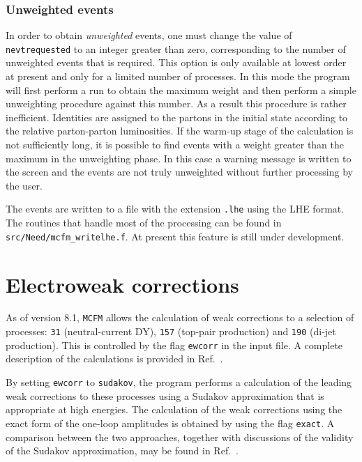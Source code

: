 \documentclass{article}
\begin{document}
\subsubsection{Unweighted events}

In order to obtain {\it unweighted} events, one must change the value of
{\tt nevtrequested} to an integer greater than zero, corresponding to the
number of unweighted events that is required. This option is only available at lowest order
at present and only for a limited number of processes.
In this mode the program will first perform a run to obtain the
maximum weight and then perform a simple unweighting procedure against this
number.   As a result this procedure is rather inefficient.
Identities are assigned to the
partons in the initial state according to the relative parton-parton
luminosities.  If the warm-up stage of the calculation is not sufficiently long, it 
is possible to find events with a weight greater than the maximum in the unweighting
phase.  In this case a warning message is written to the screen and the events are
not truly unweighted without further processing by the user.

The events are written to a file with the extension {\tt .lhe} using the LHE format.
The routines that handle most of the processing can be found in {\tt src/Need/mcfm\_writelhe.f}.
At present this feature is still under development. 

\section{Electroweak corrections}
\label{subsec:EW}

As of version 8.1, {\tt MCFM} allows the calculation of weak corrections to a
selection of processes: {\tt 31} (neutral-current DY),
{\tt 157} (top-pair production) and {\tt 190} (di-jet production).
This is controlled by the flag {\tt ewcorr} in the input file.  A complete description
of the calculations is provided in Ref.~\cite{Campbell:2016dks}.

By setting {\tt ewcorr} to {\tt sudakov}, the program performs a calculation of
the leading weak corrections to these processes using a Sudakov approximation that
is appropriate at high energies.   The calculation of the weak corrections using the
exact form of the one-loop amplitudes is obtained by using the flag {\tt exact}.
A comparison between the two approaches, together with discussions of the validity of
the Sudakov approximation, may be found in Ref.~\cite{Campbell:2016dks}.
\end{document}
